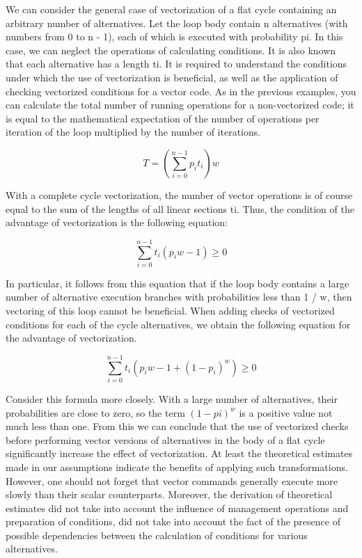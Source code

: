 \documentclass[
11pt,%
tightenlines,%
twoside,%
onecolumn,%
nofloats,%
nobibnotes,%
nofootinbib,%
superscriptaddress,%
noshowpacs,%
centertags]%
{revtex4}
\begin{document}
We can consider the general case of vectorization of a flat cycle containing an arbitrary number of alternatives. Let the loop body contain n alternatives (with numbers from 0 to n - 1), each of which is executed with probability pi. In this case, we can neglect the operations of calculating conditions. It is also known that each alternative has a length ti. It is required to understand the conditions under which the use of vectorization is beneficial, as well as the application of checking vectorized conditions for a vector code. As in the previous examples, you can calculate the total number of running operations for a non-vectorized code; it is equal to the mathematical expectation of the number of operations per iteration of the loop multiplied by the number of iterations.

\begin{equation}
T = \left( \sum_{i = 0}^{n - 1}{p_it_i} \right) w
\end{equation}

With a complete cycle vectorization, the number of vector operations is of course equal to the sum of the lengths of all linear sections ti. Thus, the condition of the advantage of vectorization is the following equation:

\begin{equation}
\sum_{i = 0}^{n - 1}{t_i(p_iw - 1)} \ge 0
\end{equation}

In particular, it follows from this equation that if the loop body contains a large number of alternative execution branches with probabilities less than 1 / w, then vectoring of this loop cannot be beneficial. When adding checks of vectorized conditions for each of the cycle alternatives, we obtain the following equation for the advantage of vectorization.

\begin{equation}
\sum_{i = 0}^{n - 1}{t_i \left( p_iw - 1 + (1 - p_i) ^w \right) } \ge 0
\end{equation}

Consider this formula more closely. With a large number of alternatives, their probabilities are close to zero, so the term $(1 - pi) ^ w$ is a positive value not much less than one. From this we can conclude that the use of vectorized checks before performing vector versions of alternatives in the body of a flat cycle significantly increase the effect of vectorization. At least the theoretical estimates made in our assumptions indicate the benefits of applying such transformations. However, one should not forget that vector commands generally execute more slowly than their scalar counterparts. Moreover, the derivation of theoretical estimates did not take into account the influence of management operations and preparation of conditions, did not take into account the fact of the presence of possible dependencies between the calculation of conditions for various alternatives.
\end{document}
